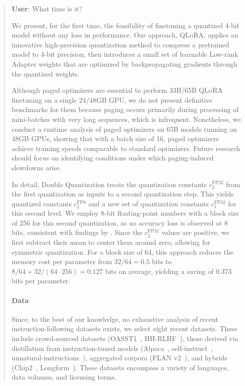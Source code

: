 \begin{quote}
    \textbf{User}: What time is it?

We present, for the first time, the feasibility of finetuning a quantized 4-bit model without any loss in performance. Our approach, \textsc{QLoRA}, applies an innovative high-precision quantization method to compress a pretrained model to 4-bit precision, then introduces a small set of learnable Low-rank Adapter weights \citep{hu2021lora} that are optimized by backpropagating gradients through the quantized weights. 

Although paged optimizers are essential to perform 33B/65B \textsc{QLoRA} finetuning on a single 24/48GB GPU, we do not present definitive benchmarks for them because paging occurs primarily during processing of mini-batches with very long sequences, which is infrequent. Nonetheless, we conduct a runtime analysis of paged optimizers on 65B models running on 48GB GPUs, showing that with a batch size of 16, paged optimizers achieve training speeds comparable to standard optimizers. Future research should focus on identifying conditions under which paging-induced slowdowns arise.

In detail, Double Quantization treats the quantization constants $c_2^{\text{FP32}}$ from the first quantization as inputs to a second quantization step. This yields quantized constants $c_2^{\text{FP8}}$ and a new set of quantization constants $c_1^{\text{FP32}}$ for this second level. We employ 8-bit floating-point numbers with a block size of 256 for this second quantization, as no accuracy loss is observed at 8 bits, consistent with findings by \citet{dettmers2022case}. Since the $c_2^{\text{FP32}}$ values are positive, we first subtract their mean to center them around zero, allowing for symmetric quantization. For a block size of 64, this approach reduces the memory cost per parameter from $32/64 = 0.5$ bits to $8/64 + 32/(64 \cdot 256) = 0.127$ bits on average, yielding a saving of 0.373 bits per parameter.

\paragraph{Data} Since, to the best of our knowledge, no exhaustive analysis of recent instruction-following datasets exists, we select eight recent datasets. These include crowd-sourced datasets (OASST1~\citep{kopf2023openassistant}, HH-RLHF~\citep{bai2022training}), those derived via distillation from instruction-tuned models (Alpaca~\citep{alpaca}, self-instruct~\citep{wang2022self}, unnatural-instructions~\citep{honovich2022unnatural}), aggregated corpora (FLAN v2~\citep{chung2022scaling}), and hybrids (Chip2~\citep{laion2023}, Longform~\citep{koksal2023longform}). These datasets encompass a variety of languages, data volumes, and licensing terms.


\end{quote}
